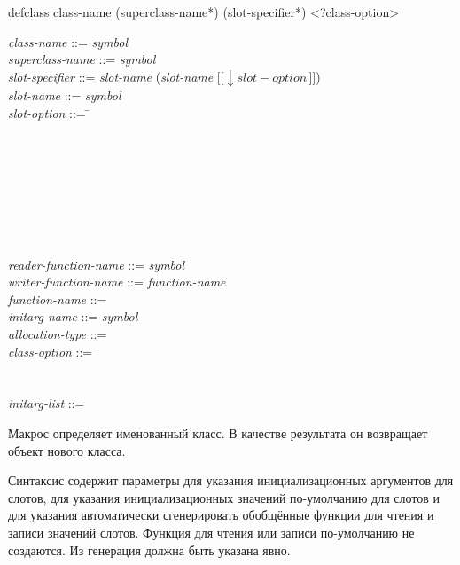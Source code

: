 \begin{defmac}
defclass class-name ({superclass-name}*)
         ({slot-specifier}*) <?class-option>

\begin{tabbing}
\emph{class-name} ::= \emph{symbol} \\
\emph{superclass-name} ::= \emph{symbol}\\
\emph{slot-specifier} ::= \emph{slot-name} {\Mor} (\emph{slot-name}  $\lbrack\!\lbrack\downarrow\!slot-option\,\rbrack\!\rbrack$)\\
\emph{slot-name} ::= \emph{symbol}\\
\emph{slot-option} ::= \= \\
\Mor~ \\
\Mor~ \\
\Mor~ \\
\Mor~ \\
\Mor~ \\
\Mor~ \\
\Mor~
\end{tabbing}
\begin{tabbing}
\emph{reader-function-name} ::= \emph{symbol}\\
\emph{writer-function-name} ::= \emph{function-name}\\
\emph{function-name} ::= \\
\emph{initarg-name} ::= \emph{symbol}\\
\emph{allocation-type} ::= \\
\emph{class-option} ::= \= \\
\Mor~ \\
\Mor~  \\
\emph{initarg-list} ::= 
\end{tabbing}
Макрос  определяет именованный класс. В качестве результата
он возвращает объект нового класса.

Синтаксис  содержит параметры для указания инициализационных
аргументов для слотов, для указания инициализационных значений по-умолчанию для
слотов и для указания автоматически сгенерировать обобщённые функции для чтения
и записи значений слотов. Функция для чтения или записи по-умолчанию не
создаются. Из генерация должна быть указана явно.


\end{defmac}
